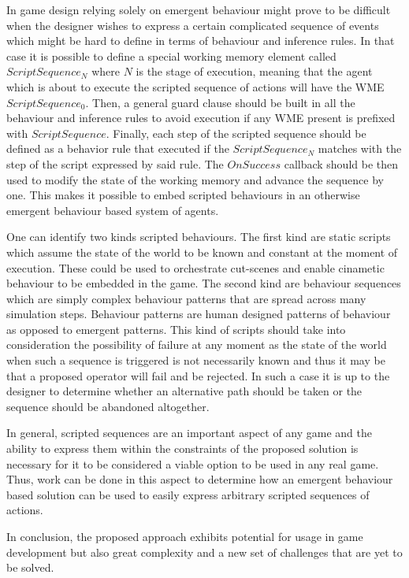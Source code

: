 In game design relying solely on emergent behaviour might prove to be difficult when the designer wishes to express a certain complicated sequence of events which might be hard to define in terms of behaviour and inference rules.
In that case it is possible to define a special working memory element called $ScriptSequence_N$ where $N$ is the stage of execution, meaning that the agent which is about to execute the scripted sequence of actions will have the WME $ScriptSequence_0$.
Then, a general guard clause should be built in all the behaviour and inference rules to avoid execution if any WME present is prefixed with $ScriptSequence$.
Finally, each step of the scripted sequence should be defined as a behavior rule that executed if the $ScriptSequence_N$ matches with the step of the script expressed by said rule.
The $OnSuccess$ callback should be then used to modify the state of the working memory and advance the sequence by one.
This makes it possible to embed scripted behaviours in an otherwise emergent behaviour based system of agents.

One can identify two kinds scripted behaviours.
The first kind are static scripts which assume the state of the world to be known and constant at the moment of execution.
These could be used to orchestrate cut-scenes and enable cinametic behaviour to be embedded in the game.
The second kind are behaviour sequences which are simply complex behaviour patterns that are spread across many simulation steps.
Behaviour patterns are human designed patterns of behaviour as opposed to emergent patterns.
This kind of scripts should take into consideration the possibility of failure at any moment as the state of the world when such a sequence is triggered is not necessarily known and thus it may be that a proposed operator will fail and be rejected.
In such a case it is up to the designer to determine whether an alternative path should be taken or the sequence should be abandoned altogether.

In general, scripted sequences are an important aspect of any game and the ability to express them within the constraints of the proposed solution is necessary for it to be considered a viable option to be used in any real game.
Thus, work can be done in this aspect to determine how an emergent behaviour based solution can be used to easily express arbitrary scripted sequences of actions.

In conclusion, the proposed approach exhibits potential for usage in game development but also great complexity and a new set of challenges that are yet to be solved.
